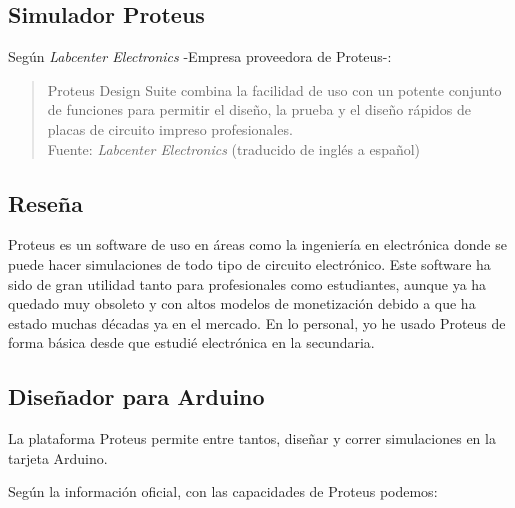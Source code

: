 \documentclass{article}
\begin{document}
    \subsection{Simulador Proteus}\label{subsec:simulador-proteus}

    Según \textit{Labcenter Electronics}\cite{labcenter-electronics-2022}
    -Empresa proveedora de Proteus-:

    \begin{quote}
        Proteus Design Suite combina la facilidad de uso con un potente
        conjunto de funciones para permitir el diseño, la prueba y el diseño
        rápidos de placas de circuito impreso profesionales.\\ \footnotesize
        Fuente: \textit{Labcenter Electronics} (traducido de inglés a
        español)~\cite{labcenter-electronics-2022}
    \end{quote}

    \subsection{Reseña}\label{subsec:review}

    Proteus es un software de uso en áreas como la ingeniería en electrónica
    donde se puede hacer simulaciones de todo tipo de circuito electrónico.
    Este software ha sido de gran utilidad tanto para profesionales como
    estudiantes, aunque ya ha quedado muy obsoleto y con altos modelos de
    monetización debido a que ha estado muchas décadas ya en el mercado. En
    lo personal, yo he usado Proteus de forma básica desde que estudié
    electrónica en la secundaria.

    \subsection{Diseñador para Arduino}\label{subsec:diseñador-para-arduino}

    La plataforma Proteus permite entre tantos, diseñar y correr simulaciones
    en la tarjeta Arduino.

    \bigbreak

    Según la información oficial, con las capacidades de Proteus podemos:
\end{document}
